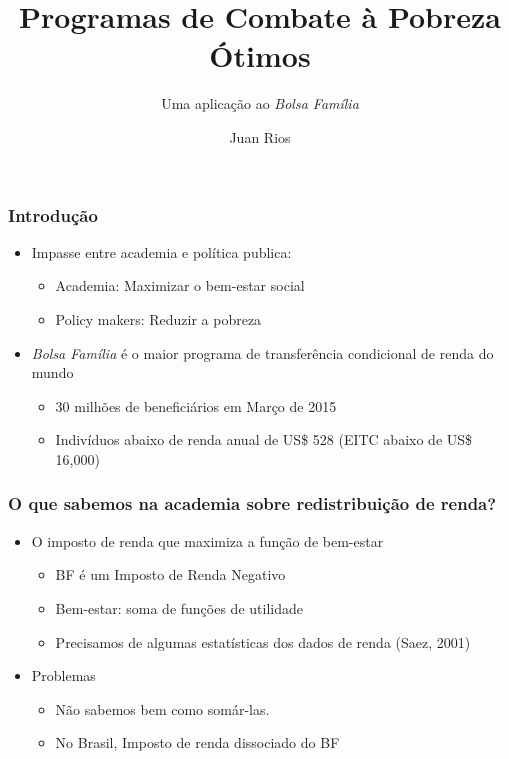 \documentclass[xcolor=pdftex,dvipsnames,table]{beamer}
\begin{document}
\title{Programas de Combate \`a Pobreza \'Otimos}
\subtitle{Uma aplica\c{c}\~ao ao \textit{Bolsa Fam\'ilia}}
\author{Juan Rios}

\maketitle

\begin{frame}
 \frametitle{Introdu\c{c}\~ao}
\pause
\begin{itemize}
\item Impasse entre academia e pol\'itica publica:
\begin{itemize}
\item Academia: Maximizar o bem-estar social
\item Policy makers: Reduzir a pobreza
\end{itemize}
\pause
\item \textit{Bolsa Fam\'ilia} \'e o maior programa de transfer\^encia condicional de renda do mundo
\begin{itemize}
\pause
\item 30 milh\~oes de benefici\'arios em Mar\c{c}o de 2015
\pause
\item Indiv\'iduos abaixo de renda anual de US\$ 528 (EITC abaixo de US\$ 16,000)
\end{itemize}
\end{itemize}
\end{frame}

\begin{frame}[label=question]
 \frametitle{O que sabemos na academia sobre redistribui\c{c}\~ao de renda?}
\begin{itemize}
\item O imposto de renda que maximiza a fun\c{c}\~ao de bem-estar
\begin{itemize}
\item BF \'e um Imposto de Renda Negativo
\item Bem-estar: soma de fun\c{c}\~oes de utilidade
\item Precisamos de algumas estat\'isticas dos dados de renda (Saez, 2001)
\end{itemize}
\pause
\item Problemas 
\begin{itemize}
\item N\~ao sabemos bem como som\'ar-las.
\item No Brasil, Imposto de renda dissociado do BF
\end{itemize}
\end{itemize}
\end{frame}
\end{document}
